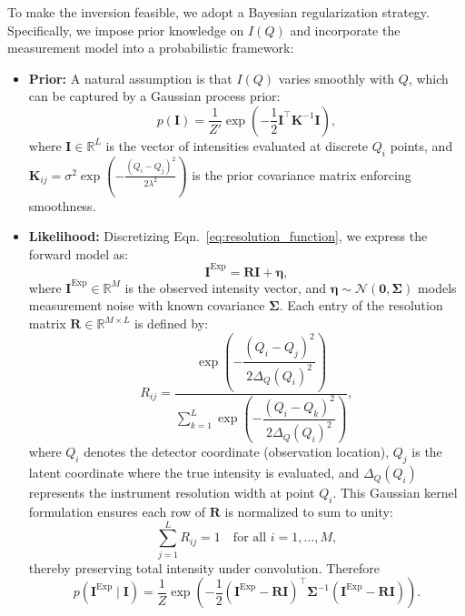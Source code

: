 \documentclass[12pt]{article}
\begin{document}
To make the inversion feasible, we adopt a Bayesian regularization strategy. Specifically, we impose prior knowledge on \( I(Q) \) and incorporate the measurement model into a probabilistic framework:

\begin{itemize}
    \item \textbf{Prior:} A natural assumption is that \( I(Q) \) varies smoothly with \( Q \), which can be captured by a Gaussian process prior:
    \begin{equation}
        p(\mathbf{I}) = \frac{1}{Z'} \exp\left( -\frac{1}{2} \mathbf{I}^\top \mathbf{K}^{-1} \mathbf{I} \right),
    \end{equation}
    where \( \mathbf{I} \in \mathbb{R}^L \) is the vector of intensities evaluated at discrete \( Q_i \) points, and \( \mathbf{K}_{ij} = \sigma^2 \exp\left(-\frac{(Q_i - Q_j)^2}{2\lambda^2} \right) \) is the prior covariance matrix enforcing smoothness.

    \item \textbf{Likelihood:} Discretizing Eqn.~\eqref{eq:resolution_function}, we express the forward model as:
    \begin{equation}
        \mathbf{I}^{\mathrm{Exp}} = \mathbf{R} \mathbf{I} + \boldsymbol{\eta},
    \end{equation}
    where \( \mathbf{I}^{\mathrm{Exp}} \in \mathbb{R}^M \) is the observed intensity vector, and \( \boldsymbol{\eta} \sim \mathcal{N}(\mathbf{0}, \boldsymbol{\Sigma}) \) models measurement noise with known covariance \( \boldsymbol{\Sigma} \).
    Each entry of the resolution matrix \( \mathbf{R} \in \mathbb{R}^{M \times L} \) is defined by:
    \begin{equation}
        R_{ij} = \frac{\exp\left( -\dfrac{(Q_i - Q_j)^2}{2 \Delta_Q(Q_i)^2} \right)}
        {\sum_{k=1}^{L} \exp\left( -\dfrac{(Q_i - Q_k)^2}{2 \Delta_Q(Q_i)^2} \right)},
    \end{equation}
    where \( Q_i \) denotes the detector coordinate (observation location), \( Q_j \) is the latent coordinate where the true intensity is evaluated, and \( \Delta_Q(Q_i) \) represents the instrument resolution width at point \( Q_i \). This Gaussian kernel formulation ensures each row of \( \mathbf{R} \) is normalized to sum to unity:
    \begin{equation}
        \sum_{j=1}^{L} R_{ij} = 1 \quad \text{for all } i = 1, \dots, M,
    \end{equation}
    thereby preserving total intensity under convolution. Therefore
    \begin{equation}
        p(\mathbf{I}^{\mathrm{Exp}}\mid \mathbf{I}) = 
        \frac{1}{Z}\exp\left( -\frac{1}{2} (\mathbf{I}^{\mathrm{Exp}} - \mathbf{R} \mathbf{I})^\top \boldsymbol{\Sigma}^{-1} (\mathbf{I}^{\mathrm{Exp}} - \mathbf{R} \mathbf{I}) \right).
    \end{equation}


\end{itemize}
\end{document}
